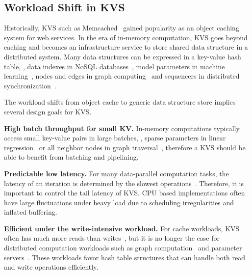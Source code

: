 \subsection{Workload Shift in KVS}
\label{sec:workload-shift}

Historically, KVS such as Memcached~\cite{fitzpatrick2004distributed} gained popularity as an object caching system for web services.
In the era of in-memory computation, KVS goes beyond caching and becomes an infrastructure service to store shared data structure in a distributed system.
Many data structures can be expressed in a key-value hash table, \eg, data indexes in NoSQL databases~\cite{chang2008bigtable}, model parameters in machine learning~\cite{li2014scaling}, nodes and edges in graph computing~\cite{shao2013trinity, xiao17tux2} and sequencers in distributed synchronization~\cite{kalia2016design}.

The workload shifts from object cache to generic data structure store implies several design goals for KVS.

\textbf{High batch throughput for small KV.}
In-memory computations typically access small key-value pairs in large batches, \eg, sparse parameters in linear regression~\cite{li2014algorithmic, xiao17tux2} or all neighbor nodes in graph traversal~\cite{shao2013trinity}, therefore a KVS should be able to benefit from batching and pipelining.

\textbf{Predictable low latency.}
For many data-parallel computation tasks, the latency of an iteration is determined by the slowest operations~\cite{ousterhout2015ramcloud}. Therefore, it is important to control the tail latency of KVS. CPU based implementations often have large fluctuations under heavy load due to scheduling irregularities and inflated buffering.

\textbf{Efficient under the write-intensive workload.}
For cache workloads, KVS often has much more reads than writes~\cite{atikoglu2012workload}, but it is no longer the case for distributed computation workloads
such as graph computation~\cite{page1999pagerank} and parameter servers~\cite{li2014scaling}.
These workloads favor hash table structures that can handle both read and write operations efficiently.


